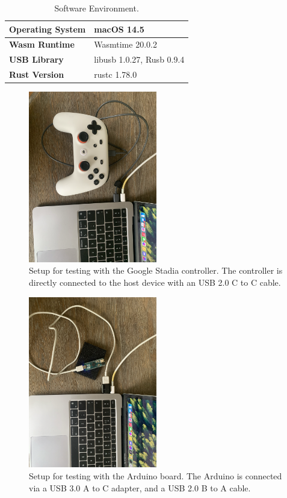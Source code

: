 \begin{table}[h]
\centering
\begin{tabular}{|l|l|}
\hline
\textbf{Operating System} & macOS 14.5 \\ \hline
\textbf{Wasm Runtime} & Wasmtime 20.0.2 \\ \hline
\textbf{USB Library} & libusb 1.0.27, Rusb 0.9.4 \\ \hline
\textbf{Rust Version} & rustc 1.78.0 \\ \hline
\end{tabular}
\caption{Software Environment.}
\label{table:software_environment}
\end{table}

\begin{figure}[H]
  \centering
  \includegraphics[width=0.5\textwidth, angle=90]{images/stadia_setup.png}
  \caption{Setup for testing with the Google Stadia controller. The controller is directly connected to the host device with an USB 2.0 C to C cable.}
  \label{fig:stadia_setup}
\end{figure}

\begin{figure}[H]
  \centering
  \includegraphics[width=0.5\textwidth, angle=90]{images/arduino_setup.png}
  \caption{Setup for testing with the Arduino board. The Arduino is connected via a USB 3.0 A to C adapter, and a USB 2.0 B to A cable.}
  \label{fig:arduino_setup}
\end{figure}


